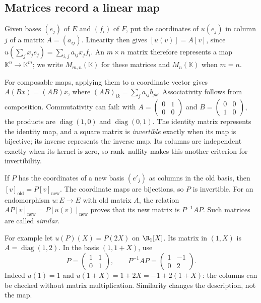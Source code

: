 \subsection*{Matrices record a linear map}
Given bases $(e_j)$ of $E$ and $(f_i)$ of $F$, put the coordinates of $u(e_j)$ in column $j$ of a matrix $A=(a_{ij})$. Linearity then gives $[u(v)]=A[v]$, since $u(\sum_jx_je_j)=\sum_{i,j}a_{ij}x_jf_i$. An $m\times n$ matrix therefore represents a map $\mathbb K^n\to\mathbb K^m$; we write $M_{m,n}(\mathbb K)$ for these matrices and $M_n(\mathbb K)$ when $m=n$.

For composable maps, applying them to a coordinate vector gives $A(Bx)=(AB)x$, where $(AB)_{ik}=\sum_ja_{ij}b_{jk}$. Associativity follows from composition. Commutativity can fail: with $A=\left(\begin{smallmatrix}0&1\\0&0\end{smallmatrix}\right)$ and $B=\left(\begin{smallmatrix}0&0\\1&0\end{smallmatrix}\right)$, the products are $\operatorname{diag}(1,0)$ and $\operatorname{diag}(0,1)$. The identity matrix represents the identity map, and a square matrix is \emph{invertible} exactly when its map is bijective; its inverse represents the inverse map. Its columns are independent exactly when its kernel is zero, so rank--nullity makes this another criterion for invertibility.

If $P$ has the coordinates of a new basis $(e'_j)$ as columns in the old basis, then $[v]_{\mathrm{old}}=P[v]_{\mathrm{new}}$. The coordinate maps are bijections, so $P$ is invertible. For an endomorphism $u:E\to E$ with old matrix $A$, the relation $AP[v]_{\mathrm{new}}=P[u(v)]_{\mathrm{new}}$ proves that its new matrix is $P^{-1}AP$. Such matrices are called \emph{similar}.

For example let $u(P)(X)=P(2X)$ on $\R_1[X]$. Its matrix in $(1,X)$ is $A=\operatorname{diag}(1,2)$. In the basis $(1,1+X)$, use
\[
P=\begin{pmatrix}1&1\\0&1\end{pmatrix},\qquad P^{-1}AP=\begin{pmatrix}1&-1\\0&2\end{pmatrix}.
\]
Indeed $u(1)=1$ and $u(1+X)=1+2X=-1+2(1+X)$: the columns can be checked without matrix multiplication. Similarity changes the description, not the map.

